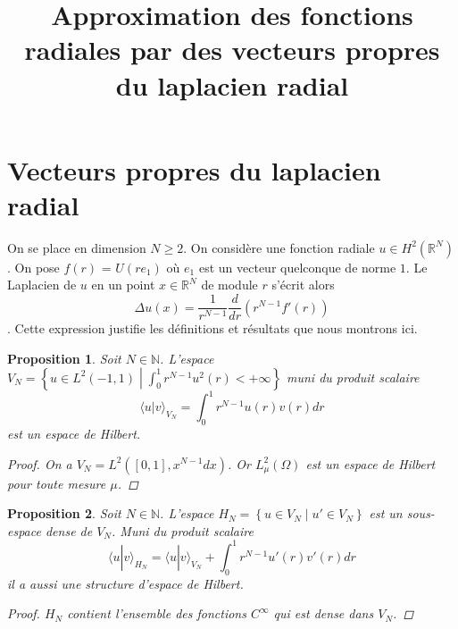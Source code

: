 \documentclass[11pt,a4paper]{article}
\title{Approximation des fonctions radiales par des vecteurs propres du laplacien radial}
\begin{document}
\renewcommand{\proofname}{Preuve}
\maketitle
\theoremstyle{plain}
\newtheorem{The}{Théorème}[section]
\newtheorem{Prop}{Proposition}[section]
\newtheorem{Cor}{Corollaire}[section]
\theoremstyle{definition}
\newtheorem{Def}{Définition}[section]
\newcommand{\enstq}[2]{\left\{#1\mathrel{}\middle|\mathrel{}#2\right\}}
\newcommand{\Lp}[2]{L^#1(#2)}
\newcommand{\Sob}[3]{W^{#1,#2}(#3)}
\newcommand{\RN}[0]{\mathbb{R}^N}
\newcommand{\norm}[1]{\left\|#1\right\|}
\newcommand{\sinc}[0]{\textup{sinc}}
\newcommand{\functionDef}[5]{\begin{array}{lllll}
#1 & : & #2 & \longrightarrow & #3 \\
 & & #4 & \longmapsto &\displaystyle #5 \\
\end{array}}

\section{Vecteurs propres du laplacien radial}

On se place en dimension $N\geq 2$. 
On considère une fonction radiale $u \in H^2(\mathbb{R}^N)$. On pose $f(r)$ = $U(re_1)$ où $e_1$ est un vecteur quelconque de norme $1$. Le Laplacien de $u$ en un point $x\in \mathbb{R}^N$ de module $r$ s'écrit alors \[\Delta u(x) = \frac{1}{r^{N-1}}\frac{d}{dr}\left(r^{N-1}f'(r)\right)\]. Cette expression justifie les définitions et résultats que nous montrons ici. 

\begin{Prop}
Soit $ N \in \mathbb{N}$. 
L'espace $V_N =  \enstq{u\in L^2(-1,1)}{\displaystyle\int_{0}^1 r^{N-1} u^2(r) < +\infty}$ muni du produit scalaire \[\langle u | v\rangle_{V_N} = \int_0^1 r^{N-1} u(r) v(r) dr \] est un espace de Hilbert. 
\begin{proof}
On a $V_N = L^2([0,1],x^{N-1}dx)$. Or $L^2_\mu(\Omega)$ est un espace de Hilbert pour toute mesure $\mu$. 
\end{proof}
\end{Prop}

\begin{Prop}
Soit $ N \in \mathbb{N}$. 
L'espace $H_N =  \enstq{u\in V_N}{u' \in V_N}$ est un sous-espace dense de $V_N$. Muni du produit scalaire \[\langle u | v\rangle_{H_N} = \langle u | v\rangle_{V_N} + \int_0^1 r^{N-1} u'(r) v'(r) dr \] il a aussi une structure d'espace de Hilbert.
\begin{proof}
$H_N$ contient l'ensemble des fonctions $C^\infty$  qui est dense dans $V_N$. 
\end{proof}
\end{Prop}
\end{document}
